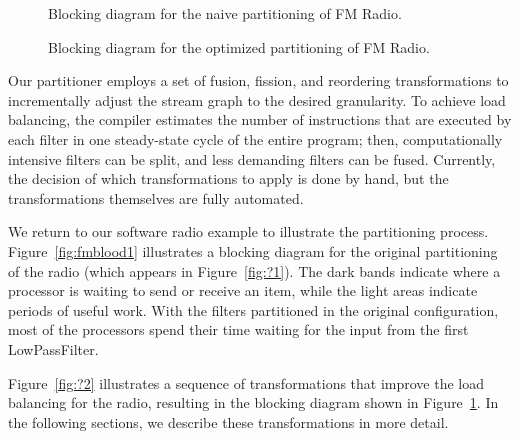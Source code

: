 \begin{figure}[t]
\vspace{-6pt}
\begin{minipage}{3.1in}
\vspace{-12pt}
\caption{\protect\small Blocking diagram for the naive partitioning of
 FM Radio.
\protect\label{fig:fmblood1}}
\end{minipage}
\hspace{0.3in}
\vspace{-12pt}
\begin{minipage}{3.1in}
\caption{\protect\small Blocking diagram for the optimized
partitioning of FM Radio.
\protect\label{fig:fmblood2}}
\end{minipage}
\vspace{-6pt}
\end{figure}

Our partitioner employs a set of fusion, fission, and reordering
transformations to incrementally adjust the stream graph to the
desired granularity.  To achieve load balancing, the compiler
estimates the number of instructions that are executed by each filter
in one steady-state cycle of the entire program; then, computationally
intensive filters can be split, and less demanding filters can be
fused.  Currently, the decision of which transformations to apply is
done by hand, but the transformations themselves are fully automated.

We return to our software radio example to illustrate the partitioning
process.  Figure~\ref{fig:fmblood1} illustrates a blocking diagram for
the original partitioning of the radio (which appears in
Figure~\ref{fig:?1}).  The dark bands indicate where a processor is
waiting to send or receive an item, while the light areas indicate
periods of useful work.  With the filters partitioned in the original
configuration, most of the processors spend their time waiting for the
input from the first LowPassFilter.

Figure~\ref{fig:?2} illustrates a sequence of transformations that
improve the load balancing for the radio, resulting in the blocking
diagram shown in Figure~\ref{fig:fmblood2}.   In the following sections, we describe these
transformations in more detail.


